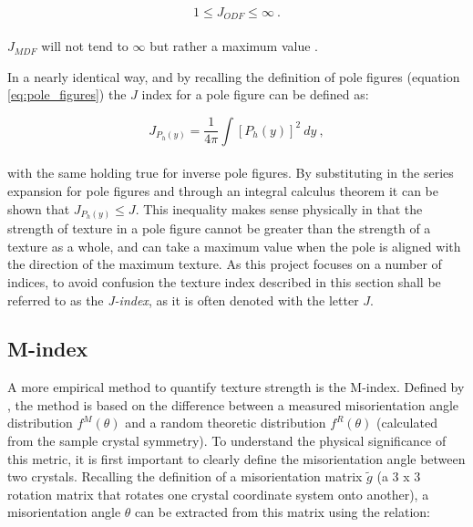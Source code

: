 \documentclass[a4paper,12pt,twoside]{report}
\numberwithin{equation}{chapter}
\begin{document}
\begin{equation}
1 \leq J_{ODF} \leq \infty\ .
\end{equation}
\\
$J_{MDF}$ will not tend to $\infty$ but rather a maximum value \citep{Mainprice}.

In a nearly identical way, and by recalling the definition of pole figures (equation \ref{eq:pole_figures}) the $J$ index for a pole figure can be defined as:
 
\begin{equation}
J_{P_h(y)} = \frac{1}{4\pi} \int [ P_{h}(y) ]^2\ dy\ ,
\end{equation}
\\
with the same holding true for inverse pole figures. By substituting in the series expansion for pole figures and through an integral calculus theorem \citep[p.90]{bunge1982texture} it can be shown that $J_{P_h(y)} \leq J$. This inequality makes sense physically in that the strength of texture in a pole figure cannot be greater than the strength of a texture as a whole, and can take a maximum value when the pole is aligned with the direction of the maximum texture. As this project focuses on a number of indices, to avoid confusion the texture index described in this section shall be referred to as the \emph{J-index}, as it is often denoted with the letter $J$.


\subsection{M-index} \label{subsec:Mindex}
A more empirical method to quantify texture strength is the M-index. Defined by \cite{Skemer}, the method is based on the difference between a measured misorientation angle distribution $f^M(\theta)$ and a random theoretic distribution $f^R(\theta)$ (calculated from the sample crystal symmetry). To understand the physical significance of this metric, it is first important to clearly define the misorientation angle between two crystals. Recalling the definition of a misorientation matrix $\tilde{g}$ (a 3 x 3 rotation matrix that rotates one crystal coordinate system onto another), a misorientation angle $\theta$ can be extracted from this matrix using the relation:
\end{document}
